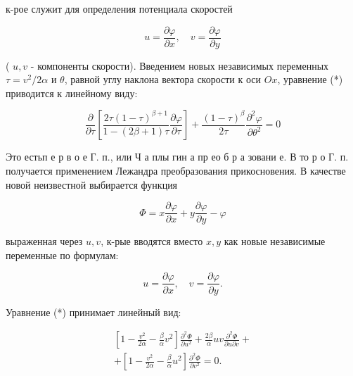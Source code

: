\documentclass[10pt]{article}
\begin{document}
к-рое служит для определения потенциала скоростей



\[

u=\frac{\partial \varphi}{\partial x}, \quad v=\frac{\partial \varphi}{\partial y}

\]



( $u, v$ - компоненты скорости). Введением новых независимых переменных $\tau=v^{2} / 2 \alpha$ и $\theta$, равной углу наклона вектора скорости к оси $O x$, уравнение (*) приводится к линейному виду:



\[

\frac{\partial}{\partial \tau}\left[\frac{2 \tau(1-\tau)^{\beta+1}}{1-(2 \beta+1) \tau} \frac{\partial \varphi}{\partial \tau}\right]+\frac{(1-\tau)^{\beta}}{2 \tau} \frac{\partial^{2} \varphi}{\partial \theta^{2}}=0

\]



Это естьп е р в о е Г. п., или Ч а плы гин а пр ео б р а зовани е. В то р о Г. п. получается применением Лежандра преобразования прикосновения. В качестве новой неизвестной выбирается функция



\[

\Phi=x \frac{\partial \varphi}{\partial x}+y \frac{\partial \varphi}{\partial y}-\varphi

\]



выраженная через $u, v$, к-рые вводятся вместо $x, y$ как новые независимые переменные по формулам:



\[

u=\frac{\partial \varphi}{\partial x}, \quad v=\frac{\partial \varphi}{\partial y} .

\]



Уравнение (*) принимает линейный вид:



\[

\begin{gathered}

{\left[1-\frac{v^{2}}{2 \alpha}-\frac{\beta}{\alpha} v^{2}\right] \frac{\partial^{2} \Phi}{\partial u^{2}}+\frac{2 \beta}{\alpha} u v \frac{\partial^{2} \Phi}{\partial u \partial v}+} \\

+\left[1-\frac{v^{2}}{2 \alpha}-\frac{\beta}{\alpha} u^{2}\right] \frac{\partial^{2} \Phi}{\partial v^{2}}=0 .

\end{gathered}

\]
\end{document}

